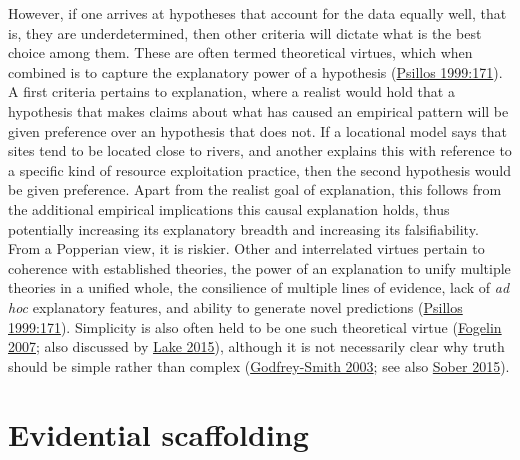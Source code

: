 \documentclass[
  12pt,
  a4paper,
  oneside]{book}
\begin{document}
However, if one arrives at hypotheses that account for the data equally well, that is, they are underdetermined, then other criteria will dictate what is the best choice among them. These are often termed theoretical virtues, which when combined is to capture the explanatory power of a hypothesis (\protect\hyperlink{ref-psillos1999}{Psillos 1999:171}). A first criteria pertains to explanation, where a realist would hold that a hypothesis that makes claims about what has caused an empirical pattern will be given preference over an hypothesis that does not. If a locational model says that sites tend to be located close to rivers, and another explains this with reference to a specific kind of resource exploitation practice, then the second hypothesis would be given preference. Apart from the realist goal of explanation, this follows from the additional empirical implications this causal explanation holds, thus potentially increasing its explanatory breadth and increasing its falsifiability. From a Popperian view, it is riskier. Other and interrelated virtues pertain to coherence with established theories, the power of an explanation to unify multiple theories in a unified whole, the consilience of multiple lines of evidence, lack of \emph{ad hoc} explanatory features, and ability to generate novel predictions (\protect\hyperlink{ref-psillos1999}{Psillos 1999:171}). Simplicity is also often held to be one such theoretical virtue (\protect\hyperlink{ref-fogelin2007}{Fogelin 2007}; also discussed by \protect\hyperlink{ref-lake2015}{Lake 2015}), although it is not necessarily clear why truth should be simple rather than complex (\protect\hyperlink{ref-godfrey-smith2003}{Godfrey-Smith 2003}; see also \protect\hyperlink{ref-sober2015}{Sober 2015}).

\hypertarget{evidential-scaffolding}{%
\section{Evidential scaffolding}\label{evidential-scaffolding}}
\end{document}
